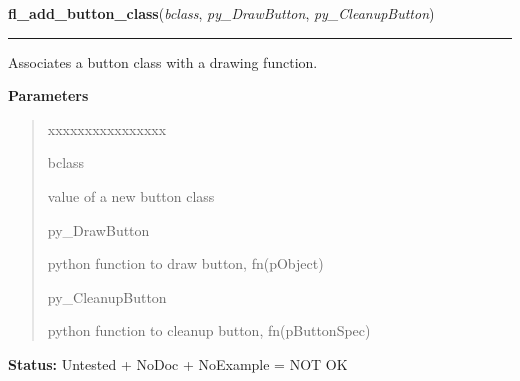     \label{xformslib:library:fl_add_button_class}

    \vspace{0.5ex}

\hspace{.8\funcindent}\begin{boxedminipage}{\funcwidth}

    \raggedright \textbf{fl\_add\_button\_class}(\textit{bclass}, \textit{py\_DrawButton}, \textit{py\_CleanupButton})

    \vspace{-1.5ex}

    \rule{\textwidth}{0.5\fboxrule}
\setlength{\parskip}{2ex}
    Associates a button class with a drawing function.

\setlength{\parskip}{1ex}
      \textbf{Parameters}
      \vspace{-1ex}

      \begin{quote}
        \begin{Ventry}{xxxxxxxxxxxxxxxx}

          \item[bclass]

          value of a new button class

          \item[py\_DrawButton]

          python function to draw button, fn(pObject)

          \item[py\_CleanupButton]

          python function to cleanup button, fn(pButtonSpec)

        \end{Ventry}

      \end{quote}

\textbf{Status:} Untested + NoDoc + NoExample = NOT OK



    \end{boxedminipage}

    \label{xformslib:library:fl_set_button_mouse_buttons}

    \vspace{0.5ex}

